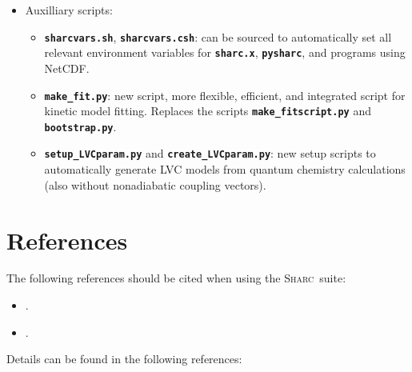 \documentclass[a4paper,10pt,DIV=15,openany]{scrbook}
\newcommand{\sharc}{\textsc{Sharc}}
\newcommand{\ttt}[1]{\textbf{\texttt{#1}}}
\begin{document}
\begin{itemize}
\begin{itemize}
  \end{itemize}
  \item Auxilliary scripts:
  \begin{itemize}
    \item \ttt{sharcvars.sh}, \ttt{sharcvars.csh}: can be sourced to automatically set all relevant environment variables for \ttt{sharc.x}, \ttt{pysharc}, and programs using NetCDF.
    \item \ttt{make\_fit.py}: new script, more flexible, efficient, and integrated script for kinetic model fitting. Replaces the scripts \ttt{make\_fitscript.py} and \ttt{bootstrap.py}.
    \item \ttt{setup\_LVCparam.py} and \ttt{create\_LVCparam.py}: new setup scripts to automatically generate LVC models from quantum chemistry calculations (also without nonadiabatic coupling vectors).
  \end{itemize}
\end{itemize}






\section{References}

The following references should be cited when using the \sharc\ suite:
{
\newcommand{\enquote}[1]{``#1''}
\begin{shaded}
  \begin{itemize}
    \item \cite{Mai2018WCMS} .
    \item \cite{Mai2019SHARC} .
  \end{itemize}
\end{shaded}
}

Details can be found in the following references:
\end{document}
